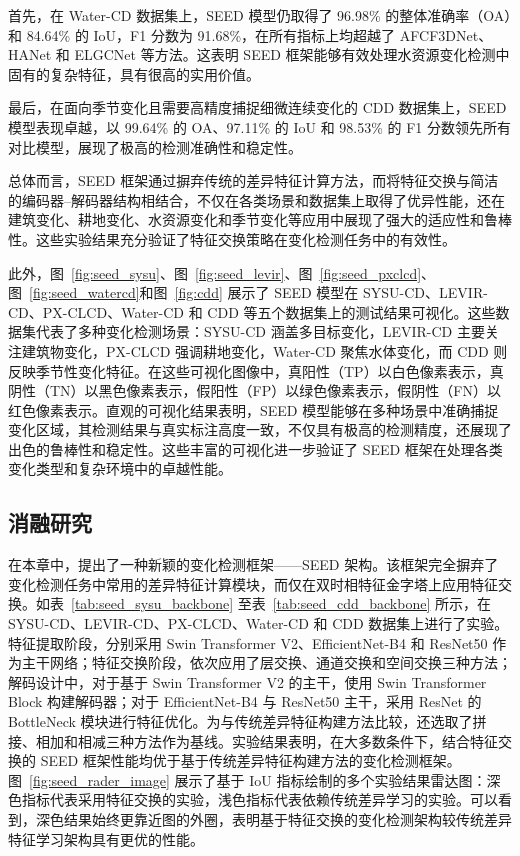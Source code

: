 首先，在 Water-CD 数据集上，SEED 模型仍取得了 96.98\% 的整体准确率（OA）和 84.64\% 的 IoU，F1 分数为 91.68\%，在所有指标上均超越了 AFCF3DNet、HANet 和 ELGCNet 等方法。这表明 SEED 框架能够有效处理水资源变化检测中固有的复杂特征，具有很高的实用价值。

最后，在面向季节变化且需要高精度捕捉细微连续变化的 CDD 数据集上，SEED 模型表现卓越，以 99.64\% 的 OA、97.11\% 的 IoU 和 98.53\% 的 F1 分数领先所有对比模型，展现了极高的检测准确性和稳定性。

总体而言，SEED 框架通过摒弃传统的差异特征计算方法，而将特征交换与简洁的编码器–解码器结构相结合，不仅在各类场景和数据集上取得了优异性能，还在建筑变化、耕地变化、水资源变化和季节变化等应用中展现了强大的适应性和鲁棒性。这些实验结果充分验证了特征交换策略在变化检测任务中的有效性。

此外，图~\ref{fig:seed_sysu}、图~\ref{fig:seed_levir}、图~\ref{fig:seed_pxclcd}、图~\ref{fig:seed_watercd}和图~\ref{fig:cdd} 展示了 SEED 模型在 SYSU-CD、LEVIR-CD、PX-CLCD、Water-CD 和 CDD 等五个数据集上的测试结果可视化。这些数据集代表了多种变化检测场景：SYSU-CD 涵盖多目标变化，LEVIR-CD 主要关注建筑物变化，PX-CLCD 强调耕地变化，Water-CD 聚焦水体变化，而 CDD 则反映季节性变化特征。在这些可视化图像中，真阳性（TP）以白色像素表示，真阴性（TN）以黑色像素表示，假阳性（FP）以绿色像素表示，假阴性（FN）以红色像素表示。直观的可视化结果表明，SEED 模型能够在多种场景中准确捕捉变化区域，其检测结果与真实标注高度一致，不仅具有极高的检测精度，还展现了出色的鲁棒性和稳定性。这些丰富的可视化进一步验证了 SEED 框架在处理各类变化类型和复杂环境中的卓越性能。

\subsection{消融研究}
在本章中，提出了一种新颖的变化检测框架——SEED 架构。该框架完全摒弃了变化检测任务中常用的差异特征计算模块，而仅在双时相特征金字塔上应用特征交换。如表~\ref{tab:seed_sysu_backbone} 至表~\ref{tab:seed_cdd_backbone} 所示，在 SYSU-CD、LEVIR-CD、PX-CLCD、Water-CD 和 CDD 数据集上进行了实验。特征提取阶段，分别采用 Swin Transformer V2、EfficientNet-B4 和 ResNet50 作为主干网络；特征交换阶段，依次应用了层交换、通道交换和空间交换三种方法；解码设计中，对于基于 Swin Transformer V2 的主干，使用 Swin Transformer Block 构建解码器；对于 EfficientNet-B4 与 ResNet50 主干，采用 ResNet 的 BottleNeck 模块进行特征优化。为与传统差异特征构建方法比较，还选取了拼接、相加和相减三种方法作为基线。实验结果表明，在大多数条件下，结合特征交换的 SEED 框架性能均优于基于传统差异特征构建方法的变化检测框架。图~\ref{fig:seed_rader_image} 展示了基于 IoU 指标绘制的多个实验结果雷达图：深色指标代表采用特征交换的实验，浅色指标代表依赖传统差异学习的实验。可以看到，深色结果始终更靠近图的外圈，表明基于特征交换的变化检测架构较传统差异特征学习架构具有更优的性能。

